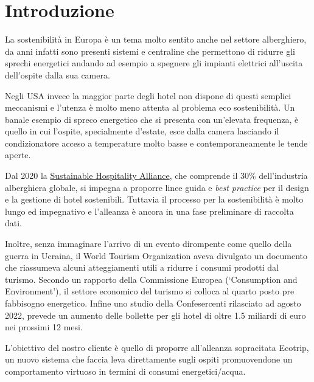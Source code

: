
\section{Introduzione}

La sostenibilità in Europa è un tema molto sentito anche nel settore alberghiero, da anni infatti sono presenti sistemi e centraline che permettono di ridurre gli sprechi energetici andando ad esempio a spegnere gli impianti elettrici all'uscita dell'ospite dalla sua camera.

Negli USA invece la maggior parte degli hotel non dispone di questi semplici meccanismi e l'utenza è molto meno attenta al problema eco sostenibilità. Un banale esempio di spreco energetico che si presenta con un'elevata frequenza, è quello in cui l'ospite, specialmente d'estate, esce dalla camera lasciando il condizionatore acceso a temperature molto basse e contemporaneamente le tende aperte.

Dal 2020 la \href{https://sustainablehospitalityalliance.org/}{Sustainable Hospitality Alliance}, che comprende il 30\% dell'industria alberghiera globale, si impegna a proporre linee guida e \textit{best practice} per il design e la gestione di hotel sostenibili. Tuttavia il processo per la sostenibilità è molto lungo ed impegnativo e l'alleanza è ancora in una fase preliminare di raccolta dati.

Inoltre, senza immaginare l'arrivo di un evento dirompente come quello della guerra in Ucraina, il World Tourism Organization aveva divulgato un documento che riassumeva alcuni atteggiamenti utili a ridurre i consumi prodotti dal turismo. Secondo un rapporto della Commissione Europea (‘Consumption and Environment’), il settore economico del turismo si colloca al quarto posto pre fabbisogno energetico. Infine uno studio della Confesercenti rilasciato ad agosto 2022, prevede un aumento delle bollette per gli hotel di oltre 1.5 miliardi di euro nei prossimi 12 mesi.

L'obiettivo del nostro cliente è quello di proporre all'alleanza sopracitata Ecotrip, un nuovo sistema che faccia leva direttamente sugli ospiti promuovendone un comportamento virtuoso in termini di consumi energetici/acqua. 


